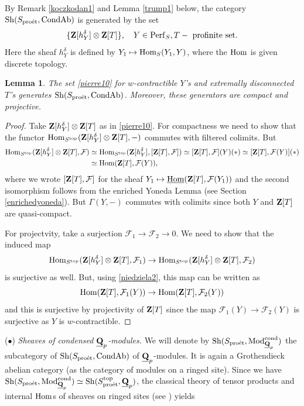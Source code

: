 \documentclass[10pt]{amsart}
\newtheorem{lemma}[equation]{Lemma}
\theoremstyle{definition}
\theoremstyle{remark}
\newcommand{\proeet}{\operatorname{pro\acute{e}t} }
\newcommand{\Hom}{{\rm{Hom}} }
\newcommand{\uHom}{\underline{{\rm{Hom}} }}
\newcommand{\sff}{{\mathcal{F}}}
\numberwithin{equation}{section}
\def\Q{{\bf Q}} \def\Z{{\bf Z}}
\numberwithin{equation}{section}
\begin{document}
  By Remark \ref{koczkodan1} and  Lemma \ref{trump1} below,  the category ${\rm Sh}(S_{\proeet},{\rm CondAb})$  is generated by the set 
\begin{equation}\label{pierre10}
\{\Z[h^{\delta}_Y]\otimes\Z[T]\}, \quad Y\in {\rm Perf}_S, T - \mbox{ profinite set}.
\end{equation}
Here the sheaf $h^{\delta}_Y$ is defined by $Y_1\mapsto \Hom_S(Y_1,Y)$, where the $\Hom$ is given discrete topology. 
\begin{lemma}\label{koczkodan2}
The set  \eqref{pierre10} for  $w$-contractible $Y$'s and  extremally disconnected $T$'s  generates ${\rm Sh}(S_{\proeet},{\rm CondAb})$.
Moreover, these generators are   compact and projective. 
\end{lemma}
\begin{proof}
Take  $\Z[h^{\delta}_Y]\otimes \Z[T]$ as in \eqref{pierre10}. For compactness we need to show that
 the functor  $\Hom_{S^{\rm top}}(\Z[h^{\delta}_Y]\otimes \Z[T], -)$ commutes with filtered colimits. But
  \begin{align}\label{niedziela2}
\Hom_{S^{\rm top}}(\Z[h^{\delta}_Y]\otimes \Z[T], \sff) & \simeq \Hom_{S^{\rm top}}(\Z[h^{\delta}_Y], [\Z[T],\sff])\simeq [\Z[T],\sff](Y)(*)\simeq [\Z[T],\sff(Y)](*)\\
 & \simeq \Hom(\Z[T],\sff(Y)),\notag
  \end{align}
  where we wrote $[\Z[T],\sff]$ for the sheaf $Y_1\mapsto \uHom(\Z[T],\sff(Y_1))$ and  the second isomorphism follows from the enriched Yoneda Lemma (see Section \ref{enrichedyoneda}). But
   $\Gamma(Y,-)$ commutes with colimits since  both $Y$  and $\Z[T]$ are  quasi-compact. 
  
    For projectvity, take a surjection $\sff_1\to \sff_2\to 0$. We need to show that the induced map 
    $$
    \Hom_{S^{\rm top}}(\Z[h^{\delta}_Y]\otimes \Z[T], \sff_1)\to \Hom_{S^{\rm top}}(\Z[h^{\delta}_Y]\otimes \Z[T], \sff_2)
    $$
    is surjective as well. But, using \eqref{niedziela2}, this map can be written as 
    $$
    \Hom(\Z[T],\sff_1(Y))\to \Hom(\Z[T],\sff_2(Y))
    $$
    and this is surjective by projectivity of $\Z[T]$ since the map $\sff_1(Y)\to \sff_2(Y)$ is surjective
as $Y$ is $w$-contractible. 
\end{proof}
 \vskip2mm
   ($\bullet$) {\em Sheaves of condensed $\underline{\Q}_p$-modules.} We will denote by 
${\rm Sh}(S_{\proeet},{\rm Mod}^{\rm cond}_{\underline{\Q}_p})$ 
the subcategory of ${\rm Sh}(S_{\proeet},{\rm CondAb})$ of  $\underline{\Q}_p$-modules. It is again a Grothendieck abelian category (as the category of modules on a ringed site). Since we have ${\rm Sh}(S_{\proeet},{\rm Mod}^{\rm cond}_{\underline{\Q}_p})\simeq {\rm Sh}(S^{\rm top}_{\proeet},\underline{\Q}_p)$,  the classical theory of tensor products and internal $\Hom$s of sheaves on ringed sites (see \cite[Tag 03A4]{Stck}) yields
\end{document}
